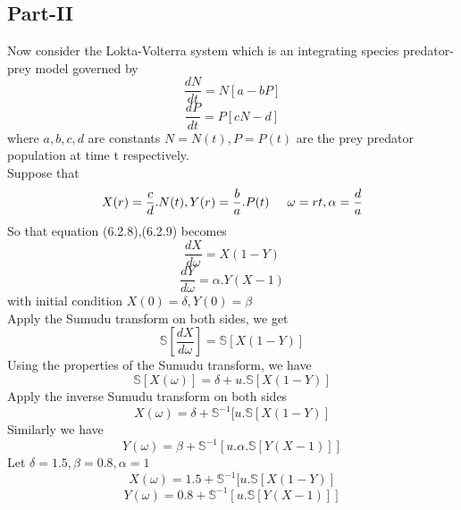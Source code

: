  \subsection{Part-II}
 Now consider the Lokta-Volterra system which is an integrating species predator-prey model governed by \cite{R9,R57,R59}\\
 \begin{equation}
\frac{dN}{dt} =N[a-bP]
\end{equation}
\begin{equation}
\frac{dP}{dt} =P[cN-d]
\end{equation}
 where $ a,b,c,d $ are constants  $N=N(t), P=P(t)$ are the prey  predator population at time t respectively.\\
 Suppose that 
 \begin{equation*}
X(r)=\frac{c}{d}.N(t),Y(r)=\frac{b}{a}.P(t)\hspace{.5cm}\omega=rt,\alpha=\frac{d}{a}
\end{equation*}
 So that equation (6.2.8),(6.2.9) becomes
 \begin{equation*}
 \frac{dX}{d\omega}=X(1-Y)
\end{equation*}
 \begin{equation*}
 \frac{dY}{d\omega}=\alpha. Y(X-1)
\end{equation*}
 with initial condition $ X(0)=\delta,Y(0)=\beta $\\
 Apply the Sumudu transform on both sides, we get
\begin{equation*}
 \mathbb{S}[\frac{dX}{d\omega} ] = \mathbb{S}[X(1-Y) ]    
\end{equation*}      
Using the properties of the Sumudu transform, we have
\begin{equation*}
\mathbb{S}[ X(\omega)] =\delta+u.\mathbb{S}[X(1-Y) ]
\end{equation*}
 Apply the inverse Sumudu transform on both sides
\begin{equation*}
X(\omega) =\delta+\mathbb{S}^{-1}[ u.\mathbb{S}[X(1-Y) ]
\end{equation*}
 Similarly we have
 \begin{equation*}
Y(\omega) =\beta+\mathbb{S}^{-1}[ u.\alpha.\mathbb{S}[Y(X-1)]]
\end{equation*}
 Let $ \delta=1.5 ,\beta=0.8 , \alpha =1 $
 \begin{equation*}
X(\omega) =1.5+\mathbb{S}^{-1}[ u.\mathbb{S}[X(1-Y) ]
\end{equation*}
 \begin{equation*}
Y(\omega) =0.8+\mathbb{S}^{-1}[ u.\mathbb{S}[Y(X-1)]]
\end{equation*}

